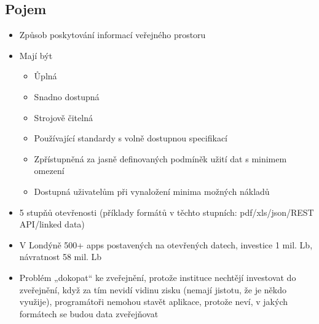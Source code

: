 \subsection{Pojem }
\begin{itemize}
      \item Způsob poskytování informací veřejného prostoru
      \item Mají být
            \begin{itemize}
                  \item Ůplná
                  \item Snadno dostupná
                  \item Strojově čitelná
                  \item Používající standardy s volně dostupnou specifikací
                  \item Zpřístupněná za jasně definovaných podmíněk užití dat s minimem omezení
                  \item Dostupná uživatelům při vynaložení minima možných nákladů
            \end{itemize}
      \item 5 stupňů otevřenosti (příklady formátů v těchto stupních: pdf/xls/json/REST API/linked data)
      \item V Londýně 500+ apps postavených na otevřených datech, investice 1 mil. Lb, návratnost 58
            mil. Lb
      \item Problém „dokopat“ ke zveřejnění, protože instituce nechtějí investovat do zveřejnění, když za
            tím nevidí vidinu zisku (nemají jistotu, že je někdo využije), programátoři nemohou stavět
            aplikace, protože neví, v jakých formátech se budou data zveřejňovat


\end{itemize}


